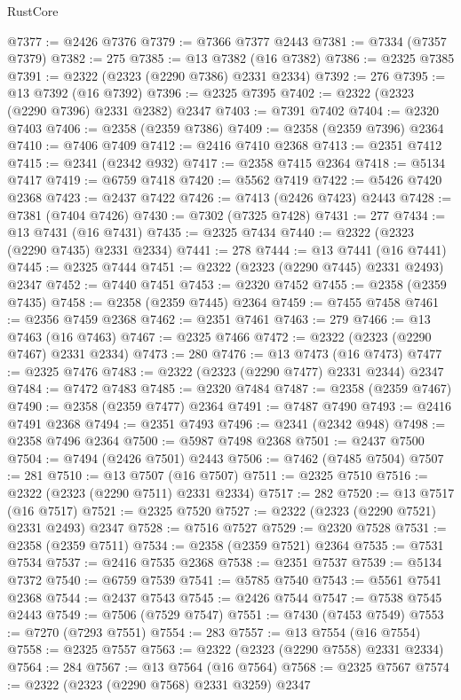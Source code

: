\begin{lexlean}{RustCore}
\begin{coremodule}
@7377 := @2426 @7376
@7379 := @7366 @7377 @2443
@7381 := @7334 (@7357 @7379)
@7382 := 275
@7385 := @13 @7382 (@16 @7382)
@7386 := @2325 @7385
@7391 := @2322 (@2323 (@2290 @7386) @2331 @2334)
@7392 := 276
@7395 := @13 @7392 (@16 @7392)
@7396 := @2325 @7395
@7402 := @2322 (@2323 (@2290 @7396) @2331 @2382) @2347
@7403 := @7391 @7402
@7404 := @2320 @7403
@7406 := @2358 (@2359 @7386)
@7409 := @2358 (@2359 @7396) @2364
@7410 := @7406 @7409
@7412 := @2416 @7410 @2368
@7413 := @2351 @7412
@7415 := @2341 (@2342 @932)
@7417 := @2358 @7415 @2364
@7418 := @5134 @7417
@7419 := @6759 @7418
@7420 := @5562 @7419
@7422 := @5426 @7420 @2368
@7423 := @2437 @7422
@7426 := @7413 (@2426 @7423) @2443
@7428 := @7381 (@7404 @7426)
@7430 := @7302 (@7325 @7428)
@7431 := 277
@7434 := @13 @7431 (@16 @7431)
@7435 := @2325 @7434
@7440 := @2322 (@2323 (@2290 @7435) @2331 @2334)
@7441 := 278
@7444 := @13 @7441 (@16 @7441)
@7445 := @2325 @7444
@7451 := @2322 (@2323 (@2290 @7445) @2331 @2493) @2347
@7452 := @7440 @7451
@7453 := @2320 @7452
@7455 := @2358 (@2359 @7435)
@7458 := @2358 (@2359 @7445) @2364
@7459 := @7455 @7458
@7461 := @2356 @7459 @2368
@7462 := @2351 @7461
@7463 := 279
@7466 := @13 @7463 (@16 @7463)
@7467 := @2325 @7466
@7472 := @2322 (@2323 (@2290 @7467) @2331 @2334)
@7473 := 280
@7476 := @13 @7473 (@16 @7473)
@7477 := @2325 @7476
@7483 := @2322 (@2323 (@2290 @7477) @2331 @2344) @2347
@7484 := @7472 @7483
@7485 := @2320 @7484
@7487 := @2358 (@2359 @7467)
@7490 := @2358 (@2359 @7477) @2364
@7491 := @7487 @7490
@7493 := @2416 @7491 @2368
@7494 := @2351 @7493
@7496 := @2341 (@2342 @948)
@7498 := @2358 @7496 @2364
@7500 := @5987 @7498 @2368
@7501 := @2437 @7500
@7504 := @7494 (@2426 @7501) @2443
@7506 := @7462 (@7485 @7504)
@7507 := 281
@7510 := @13 @7507 (@16 @7507)
@7511 := @2325 @7510
@7516 := @2322 (@2323 (@2290 @7511) @2331 @2334)
@7517 := 282
@7520 := @13 @7517 (@16 @7517)
@7521 := @2325 @7520
@7527 := @2322 (@2323 (@2290 @7521) @2331 @2493) @2347
@7528 := @7516 @7527
@7529 := @2320 @7528
@7531 := @2358 (@2359 @7511)
@7534 := @2358 (@2359 @7521) @2364
@7535 := @7531 @7534
@7537 := @2416 @7535 @2368
@7538 := @2351 @7537
@7539 := @5134 @7372
@7540 := @6759 @7539
@7541 := @5785 @7540
@7543 := @5561 @7541 @2368
@7544 := @2437 @7543
@7545 := @2426 @7544
@7547 := @7538 @7545 @2443
@7549 := @7506 (@7529 @7547)
@7551 := @7430 (@7453 @7549)
@7553 := @7270 (@7293 @7551)
@7554 := 283
@7557 := @13 @7554 (@16 @7554)
@7558 := @2325 @7557
@7563 := @2322 (@2323 (@2290 @7558) @2331 @2334)
@7564 := 284
@7567 := @13 @7564 (@16 @7564)
@7568 := @2325 @7567
@7574 := @2322 (@2323 (@2290 @7568) @2331 @3259) @2347

\end{coremodule}
\end{lexlean}
